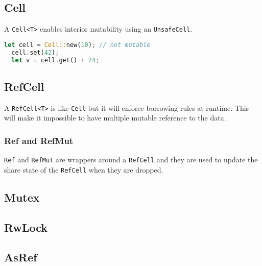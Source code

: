 \documentclass{article}
\begin{document}
\subsection{Cell}

A \texttt{Cell<T>} enables interior mutability using an \texttt{UnsafeCell}.

\begin{lstlisting}[language=Rust, style=boxed, numbers=none]
  let cell = Cell::new(10); // not mutable
  cell.set(42);
  let v = cell.get() + 24;
\end{lstlisting}

\subsection{RefCell}

A \texttt{RefCell<T>} is like \texttt{Cell} but it will enforce
borrowing rules at runtime. This will make it impossible
to have multiple mutable reference to the data.

\subsubsection{Ref and RefMut}

\texttt{Ref} and \texttt{RefMut} are wrappers around a \texttt{RefCell}
and they are used to update the share state of the \texttt{RefCell}
when they are dropped.

\subsection{Mutex}

\subsection{RwLock}

\subsection{AsRef}
\end{document}
